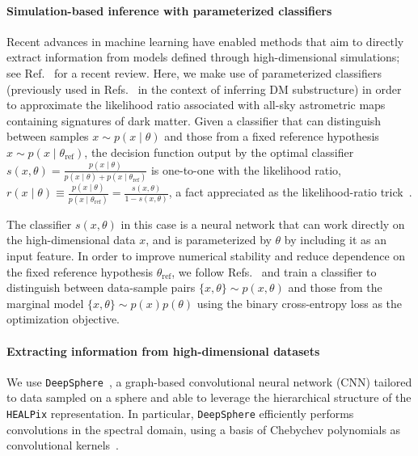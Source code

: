 \documentclass[]{article}
\begin{document}
\paragraph{Simulation-based inference with parameterized classifiers} Recent advances in machine learning have enabled methods that aim to directly extract information from models defined through high-dimensional simulations; see Ref.~\cite{Cranmer:2019eaq} for a recent review. Here, we make use of parameterized classifiers~\cite{Cranmer:2015bka,Baldi:2016fzo,Brehmer:2018eca,Brehmer:2018hga,Brehmer:2018kdj,Hermans:2019ioj} (previously used in Refs.~\cite{Brehmer:2019jyt,Hermans:2020skz} in the context of inferring DM substructure) in order to approximate the likelihood ratio associated with all-sky astrometric maps containing signatures of dark matter. Given a classifier that can distinguish between samples $x \sim p(x\mid\theta)$ and those from a fixed reference hypothesis $x \sim p(x\mid\theta_\mathrm{ref})$, the decision function output by the optimal classifier $s(x, \theta) = \frac{p(x\mid\theta)}{p(x\mid\theta) + p(x\mid\theta_\mathrm{ref})}$ is one-to-one with the likelihood ratio, $r(x\mid \theta) \equiv \frac{p(x\mid\theta)}{p(x\mid\theta_\mathrm{ref})}  = \frac{s(x, \theta)}{1 - s(x, \theta)}$, a fact appreciated as the likelihood-ratio trick~\cite{Cranmer:2015bka}. 

The classifier $s(x, \theta)$ in this case is a neural network that can work directly on the high-dimensional data $x$, and is parameterized by $\theta$ by including it as an input feature. In order to improve numerical stability and reduce dependence on the fixed reference hypothesis $\theta_\mathrm{ref}$, we follow Refs.~\cite{Brehmer:2019jyt,Hermans:2019ioj} and train a classifier to distinguish between data-sample pairs $\{x, \theta\} \sim p(x,\theta)$ and those from the marginal model $\{x, \theta\} \sim p(x)p(\theta)$ using the binary cross-entropy loss as the optimization objective. 

\paragraph{Extracting information from high-dimensional datasets} We use \texttt{DeepSphere}~\cite{2020arXiv201215000D,Perraudin:2018rbt}, a graph-based convolutional neural network (CNN) tailored to data sampled on a sphere and able to leverage the hierarchical structure of the \texttt{HEALPix} representation. In particular, \texttt{DeepSphere} efficiently performs convolutions in the spectral domain, using a basis of Chebychev polynomials as convolutional kernels~\cite{2016arXiv160609375D}. 
\end{document}
